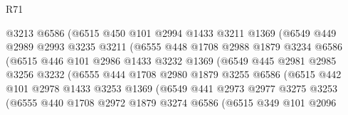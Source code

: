 \begin{lexlean}{R71}
\begin{coremodule}
                        @3213
                        @6586
                        (@6515
                          @450
                          @101
                          @2994
                          @1433
                          @3211
                          @1369
                          (@6549
                            @449
                            @2989
                            @2993
                            @3235
                            @3211
                            (@6555
                              @448
                              @1708
                              @2988
                              @1879
                              @3234
                              @6586
                              (@6515
                                @446
                                @101
                                @2986
                                @1433
                                @3232
                                @1369
                                (@6549
                                  @445
                                  @2981
                                  @2985
                                  @3256
                                  @3232
                                  (@6555
                                    @444
                                    @1708
                                    @2980
                                    @1879
                                    @3255
                                    @6586
                                    (@6515
                                      @442
                                      @101
                                      @2978
                                      @1433
                                      @3253
                                      @1369
                                      (@6549
                                        @441
                                        @2973
                                        @2977
                                        @3275
                                        @3253
                                        (@6555
                                          @440
                                          @1708
                                          @2972
                                          @1879
                                          @3274
                                          @6586
                                          (@6515
                                            @349
                                            @101
                                            @2096

\end{coremodule}
\end{lexlean}
